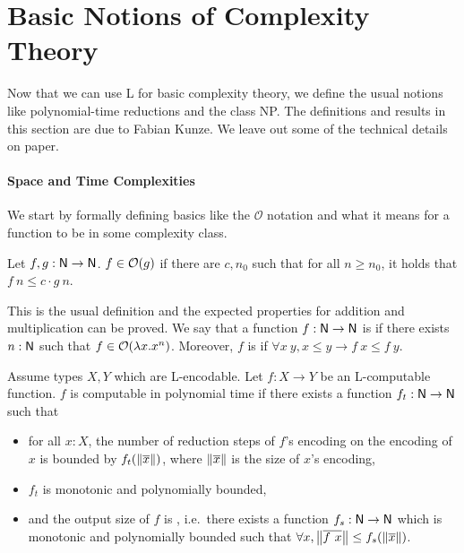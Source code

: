 \section{Basic Notions of Complexity Theory}\label{sec:np_basics}
Now that we can use L for basic complexity theory, we define the usual notions like polynomial-time reductions and the class \textsf{NP}. The definitions and results in this section are due to Fabian Kunze. We leave out some of the technical details on paper.

\paragraph{Space and Time Complexities}
We start by formally defining basics like the $\mathcal{O}$ notation and what it means for a function to be in some complexity class.
\begin{definition}[$\mathcal{O}$][inO]
  Let $f, g : \mathsf{N} \rightarrow \mathsf{N}$. $f \in \mathcal{O}{(g)}$ if there are $c, n_0$ such that for all $n \ge n_0$, it holds that $f~n \le c \cdot g~n$.
\end{definition}
This is the usual definition and the expected properties for addition and multiplication can be proved. 
We say that a function $f : \mathsf{N} \rightarrow \mathsf{N}$ is  if there exists $n : \mathsf{N}$ such that $f \in \mathcal{O}{(\lambda x. x^n)}$. Moreover, $f$ is  if $\forall x~y, x \le y \rightarrow f~x \le f~y$.

\begin{definition}
  Assume types $X, Y$ which are L-encodable.
  Let $f : X \rightarrow Y$ be an L-computable function.  
  $f$ is computable in polynomial time if there exists a function $f_t : \mathsf{N} \rightarrow \mathsf{N}$ such that
  \begin{itemize}
    \item for all $x : X$, the number of reduction steps of $f$'s encoding on the encoding of $x$ is bounded by $f_t(\left\lVert\overline{x}\right\rVert)$, where $\left\lVert\overline{x}\right\rVert$ is the size of $x$'s encoding, 
    \item $f_t$ is monotonic and polynomially bounded, 
    \item and the output size of $f$ is , i.e.\ there exists a function $f_s : \mathsf{N} \rightarrow \mathsf{N}$ which is monotonic and polynomially bounded such that $\forall x, \left\lVert\overline{f~x}\right\rVert \le f_s (\left\lVert\overline{x}\right\rVert)$. 
  \end{itemize}
\end{definition}

